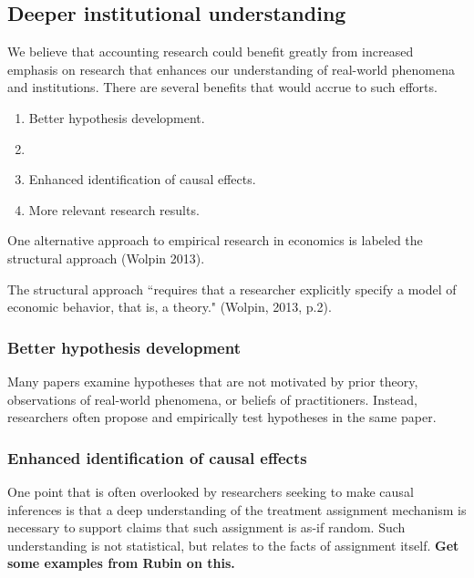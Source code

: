 \documentclass[11pt]{amsart}
\begin{document}



\subsection{Deeper institutional understanding}

We believe that accounting research could benefit greatly from increased emphasis on research that enhances our understanding of real-world phenomena and institutions. There are several benefits that would accrue to such efforts.

\begin{enumerate}
\item Better hypothesis development.  
\item %
\item Enhanced identification of causal effects.
\item More relevant research results.
\end{enumerate}

One alternative approach to empirical research in economics is labeled the structural approach (Wolpin 2013).

The structural approach ``requires that a researcher explicitly specify a model of economic behavior, that is, a theory." (Wolpin, 2013, p.2).


\subsubsection{Better hypothesis development}
Many papers examine hypotheses that are not motivated by prior theory,  observations of real-world phenomena, or beliefs of practitioners. Instead, researchers often propose and empirically test hypotheses in the same paper.

\subsubsection{Enhanced identification of causal effects}
One point that is often overlooked by researchers seeking to make causal inferences is that a deep understanding of the treatment assignment mechanism is necessary to support claims that such assignment is as-if random. Such understanding is not statistical, but relates to the facts of assignment itself. \textbf{Get some examples from Rubin on this.}
\end{document}
